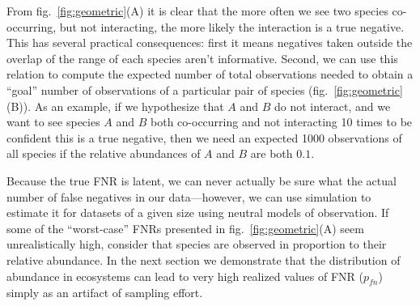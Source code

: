 \documentclass[11pt]{article}
\begin{document}
From fig.~\ref{fig:geometric}(A) it is clear that the more often we see
two species co-occurring, but not interacting, the more likely the
interaction is a true negative. This has several practical consequences:
first it means negatives taken outside the overlap of the range of each
species aren't informative. Second, we can use this relation to compute
the expected number of total observations needed to obtain a ``goal''
number of observations of a particular pair of species
(fig.~\ref{fig:geometric}(B)). As an example, if we hypothesize that
\(A\) and \(B\) do not interact, and we want to see species \(A\) and
\(B\) both co-occurring and not interacting 10 times to be confident
this is a true negative, then we need an expected 1000 observations of
all species if the relative abundances of \(A\) and \(B\) are both
\(0.1\).

Because the true FNR is latent, we can never actually be sure what the
actual number of false negatives in our data---however, we can use
simulation to estimate it for datasets of a given size using neutral
models of observation. If some of the ``worst-case'' FNRs presented in
fig.~\ref{fig:geometric}(A) seem unrealistically high, consider that
species are observed in proportion to their relative abundance. In the
next section we demonstrate that the distribution of abundance in
ecosystems can lead to very high realized values of FNR (\(p_{fn}\))
simply as an artifact of sampling effort.
\end{document}
